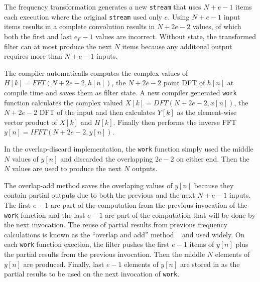 The frequency transformation generates a new {\tt stream} that
uses $N+e-1$ items each execution where the original {\tt stream} used only $e$.
Using $N+e-1$ input items results in a complete convolution results in 
$N+2e-2$ values, of which both the first and last $e_F-1$ values 
are incorrect. Without state, the transformed filter can at most produce 
the next $N$ items because any additonal output requires more than $N+e-1$ inputs.

The compiler automaticalls computes the complex values of $H[k]=FFT(N+2e-2,h[n])$,
the $N+2e-2$ point DFT of $h[n]$ at compile time and saves them as filter state. 
A new compiler generated {\tt work} function calculates the complex valued $X[k]=DFT(N+2e-2,x[n])$, 
the $N+2e-2$ DFT of the input and then calculates $Y[k]$ as the element-wise vector 
product of $X[k]$ and $H[k]$. Finally then performs the inverse FFT $y[n]=IFFT(N+2e-2,y[n])$.

In the overlap-discard implementation, the {\tt work} function simply used the middle $N$ 
values of $y[n]$ and discarded the overlapping $2e-2$ on either end. Then the $N$ values 
are used to produce the next $N$ outputs.

The overlap-add method saves the overlaping values of $y[n]$ because they contain partial
outputs due to both the previous and the next $N+e-1$ inputs.
The first $e-1$ are part of the computation from the previous invocation of the 
{\tt work} function and the last $e-1$ are part of the computation that will be done
by the next invocation. 
The reuse of partial results from previous frequency calculations is known 
as the ``overlap and add'' method ~\cite{oppenheim-discrete} and used widely.
On each {\tt work} function exection, the filter pushes the first $e-1$ items 
of $y[n]$ plus the partial results from the previous invocation. Then the middle 
$N$ elements of $y[n]$ are produced. Finally, last $e-1$ elements 
of $y[n]$ are stored in as the partial results to be used on the next 
invocation of {\tt work}.

